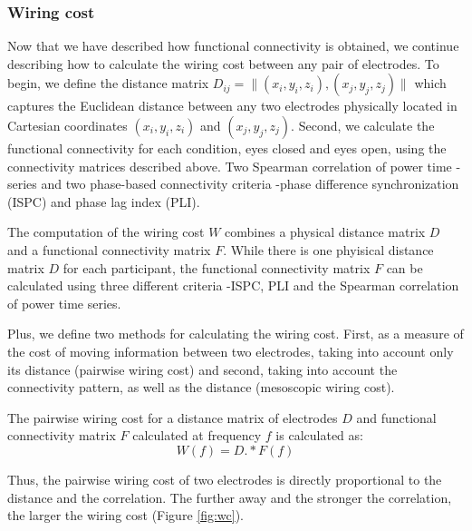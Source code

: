 \documentclass[11pt, onecolumn]{article}
\begin{document}
{\subsubsection{Wiring cost}
Now that we have described how functional connectivity is obtained, we continue describing how to calculate the wiring cost between any pair of electrodes. 
To begin, we define the distance matrix   
$D_{ij} = \Big\|(x_i,y_i,z_i),(x_j,y_j,z_j) \Big\|$ 
which captures the Euclidean distance between any two electrodes physically located in Cartesian coordinates $(x_i,y_i,z_i)$ and $(x_j,y_j,z_j)$.
Second, we calculate the functional connectivity for each condition, eyes closed and eyes open, using the connectivity matrices described above. Two Spearman correlation of power time -series and two phase-based connectivity criteria -phase difference synchronization (ISPC) and phase lag index (PLI). %

The computation of the wiring cost $W$ combines a physical distance matrix $D$ and a functional connectivity matrix $F$. While there is one  phyisical distance matrix $D$ for each participant, the functional connectivity matrix $F$ can be calculated using three different criteria -ISPC, PLI and the Spearman correlation of power time series.

Plus, we define two methods for calculating the  wiring cost. First, as a measure of the cost of moving information between two electrodes, taking into account only its distance (pairwise wiring cost) and second, taking into account the connectivity pattern, as well as the distance  (mesoscopic wiring cost).

The pairwise wiring cost for a distance matrix of electrodes $D$ and functional connectivity matrix $F$ calculated at frequency $f$ is calculated as:
\begin{equation}
W(f) = D.*F(f)
\label{eq:pairwc}
\end{equation} 

Thus, the pairwise wiring cost of two electrodes is directly proportional to the distance and the correlation. The further away and the stronger the correlation, the larger the wiring cost (Figure \ref{fig:wc}). 

}
\end{document}
